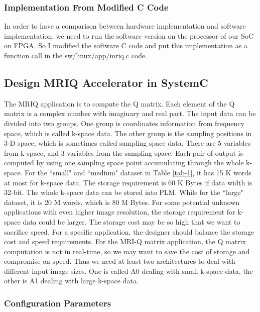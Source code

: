 \documentclass{sig-alternate}
\begin{document}
\subsubsection{Implementation From Modified C Code}
In order to have a comparison between hardware implementation and software implementation, we need to run the software version on the processor of our SoC on FPGA. So I modified the software C code and put this implementation as a function call in the sw/linux/app/mriq.c code.\\

\subsection{Design MRIQ Accelerator in SystemC}

The MRIQ application is to compute the Q matrix. Each element of the Q matrix is a complex number with imaginary and real part. The input data can be divided into two groups. One group is coordinates information from frequency space, which is called k-space data. The other group is the sampling positions in 3-D space, which is sometimes called sampling space data. There are 5 variables from k-space, and 3 variables from the sampling space. Each pair of output is computed by using one sampling space point accumulating through the whole k-space. For the ``small" and ``medium" dataset in Table \ref{tab-1}, it has 15 K words at most for k-space data. The storage requirement is 60 K Bytes if data width is 32-bit. The whole k-space data can be stored into PLM. While for the ``large" dataset, it is 20 M words, which is 80 M Bytes. For some potential unknown applications with even higher image resolution, the storage requirement for k-space data could be larger. The storage cost may be so high that we want to sacrifice speed. For a specific application, the designer should balance the storage cost and speed requirements. For the MRI-Q matrix application, the Q matrix computation is not in real-time, so we may want to save the cost of storage and compromise on speed. Thus we need at least two architectures to deal with different input image sizes. One is called A0 dealing with small k-space data, the other is A1 dealing with large k-space data.\\



\subsubsection{Configuration Parameters}
\end{document}
